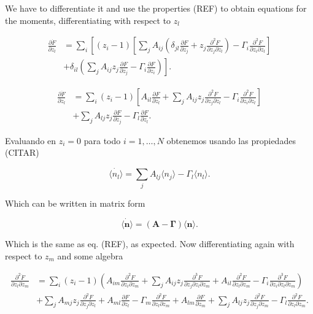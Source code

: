 We have to differentiate it and use the properties (REF) to obtain equations for the moments, differentiating with respect to $z_l$

\begin{equation}
\begin{split}
\frac{\partial \dot{F}}{\partial z_l} &= \sum_i\left[(z_i-1)\left[\sum_jA_{ij}\left(\delta_{jl}\frac{\partial F}{\partial z_j}+z_j\frac{\partial^2 F}{\partial z_j\partial z_l}\right)-\Gamma_i\frac{\partial^2 F}{\partial z_i\partial z_l}\right]\right.\\
&+\left.\delta_{il}\left(\sum_jA_{ij}z_j\frac{\partial F}{\partial z_j}-\Gamma_i\frac{\partial F}{\partial z_i}\right)\right].
\end{split}
\end{equation}

\begin{equation}
\begin{split}
\frac{\partial \dot{F}}{\partial z_l} &= \sum_i(z_i-1)\left[A_{il}\frac{\partial F}{\partial z_l}+\sum_jA_{ij}z_j\frac{\partial^2 F}{\partial z_j\partial z_l}-\Gamma_i\frac{\partial^2 F}{\partial z_i\partial z_l}\right]\\
&+\sum_jA_{lj}z_j\frac{\partial F}{\partial z_j}-\Gamma_l\frac{\partial F}{\partial z_l}.
\end{split}
\end{equation}

Evaluando en $z_i=0$ para todo $i=1,\dotsc,N$ obtenemos usando las propiedades (CITAR)

\begin{equation}
\dot{\langle n_l \rangle} = \sum_jA_{lj}\langle n_j\rangle-\Gamma_l\langle n_l\rangle.
\end{equation}

Which can be written in matrix form

\begin{equation}
\dot{\langle \mathbf{n}\rangle} = (\mathbf{A}-\mathbf{\Gamma})\langle \mathbf{n}\rangle.
\end{equation}

Which is the same as  eq. (REF), as expected. Now differentiating again with respect to $z_m$ and some algebra

\begin{equation}
\begin{split}
\frac{\partial^2 \dot{F}}{\partial z_l \partial z_m} &= \sum_i(z_i-1) \left(A_{im}\frac{\partial^2F}{\partial z_i \partial z_m} + \sum_jA_{ij}z_j\frac{\partial^3F}{\partial z_j \partial z_l \partial z_m}+A_{il}\frac{\partial^2F}{\partial z_l\partial z_m} - \Gamma_i\frac{\partial^3F}{\partial z_i \partial z_l \partial z_m}   \right)\\
&+\sum_jA_{mj}z_j\frac{\partial^2F}{\partial z_j\partial z_l}+A_{ml}\frac{\partial F}{\partial z_l} - \Gamma_m\frac{\partial^2F}{\partial z_l\partial z_m} + A_{lm}\frac{\partial F}{\partial z_m} + \sum_jA_{lj}z_j\frac{\partial^2F}{\partial z_j\partial z_m}-\Gamma_l\frac{\partial^2F}{\partial z_l\partial z_m}.
\end{split}
\end{equation}

